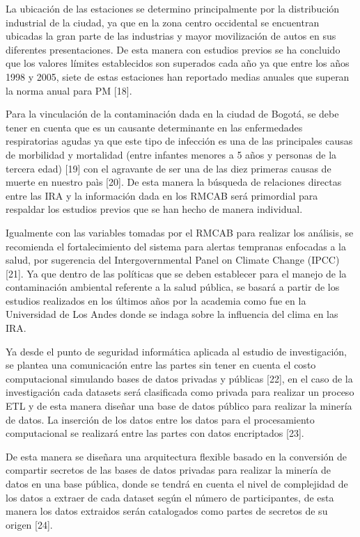 \documentclass[a4paper, 11pt, oneside]{article}
\theoremstyle{definition}
\theoremstyle{remark}
\begin{document}
La ubicación de las estaciones se determino principalmente por la distribución  industrial de la ciudad, ya que en la zona centro occidental se encuentran ubicadas la gran parte de las industrias y mayor movilización de autos en sus diferentes presentaciones. De esta manera con estudios previos se ha concluido que los valores límites establecidos son superados cada año ya que entre los años 1998 y 2005, siete de estas estaciones han reportado medias anuales que superan la norma anual para PM [18].

Para la vinculación de la contaminación dada en la ciudad de Bogotá, se debe tener en cuenta que es un causante determinante en las enfermedades respiratorias agudas ya que este tipo de infección es una de las principales causas de morbilidad y mortalidad (entre infantes menores a 5 años y personas de la tercera edad) [19] con el agravante de ser una de las diez primeras causas de muerte en nuestro paìs [20]. De esta manera la búsqueda de relaciones directas entre las IRA y la información dada en los RMCAB será primordial para respaldar los estudios previos que se han hecho de manera individual. 


Igualmente con las variables tomadas por el RMCAB para realizar los análisis, se recomienda el fortalecimiento del sistema para alertas tempranas enfocadas a la salud, por sugerencia del Intergovernmental Panel on Climate Change (IPCC) [21]. Ya que dentro de las políticas que se deben establecer para el manejo de la contaminación ambiental referente a la salud pública, se basará a partir de los estudios realizados en los últimos años por la academia como fue en la Universidad de Los Andes donde se indaga sobre la influencia del clima en las IRA.

Ya desde el punto de seguridad informática aplicada al estudio de investigación, se plantea una comunicación entre las partes sin tener en cuenta el costo computacional simulando bases de datos privadas y públicas [22], en el caso de la investigación cada datasets será clasificada como privada para realizar un proceso ETL y de esta manera diseñar una base de datos público para realizar la minería de datos. La inserción de los datos entre los datos para el procesamiento computacional se realizará entre las partes con datos encriptados [23].

De esta manera se diseñara una arquitectura flexible basado en la conversión de compartir secretos de las bases de datos privadas para realizar la minería de datos en una base pública, donde se tendrá en cuenta el nivel de complejidad de los datos a extraer de cada dataset según el número de participantes, de esta manera los datos extraidos serán catalogados como partes de secretos de su origen [24].
\end{document}
